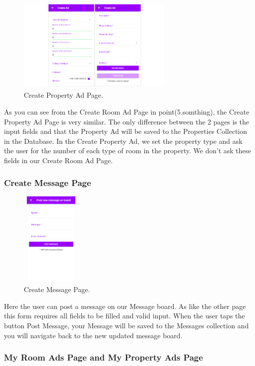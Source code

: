\begin{figure}[h]
\centering
\includegraphics[width=7.5cm, height=4.6cm]{img/createProperty}
\caption{Create Property Ad Page.}
\end{figure}

As you can see from the Create Room Ad Page in point(5.somthing), the Create Property Ad Page is very similar. The only difference between the 2 pages is the input fields and that the Property Ad will be saved to the Properties Collection in the Database. In the Create Property Ad, we set the property type and ask the user for the number of each type of room in the property. We don’t ask these fields in our Create Room Ad Page.

\subsubsection{Create Message Page}

\begin{figure}[h]
\centering
\includegraphics[width=2.9cm, height=4.6cm]{img/CreateMessage}
\caption{Create Message Page.}
\end{figure}

Here the user can post a message on our Message board. As like the other page this form requires all fields to be filled and valid input. When the user taps the button Post Message, your Message will be saved to the Messages collection and you will navigate back to the new updated message board.
    
\subsubsection{My Room Ads Page and My Property Ads Page}

